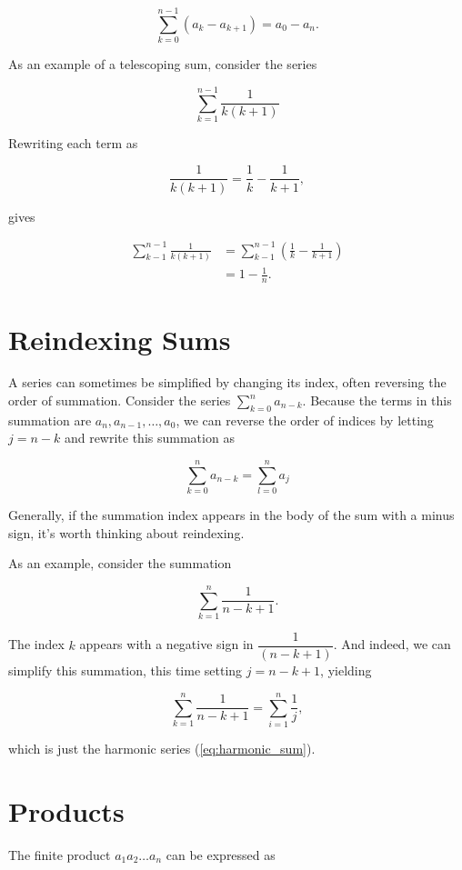 \[
    \sum_{k=0}^{n-1}\left(a_k-a_{k+1}\right)=a_0-a_n .
\]

As an example of a telescoping sum, consider the series

\[
\sum_{k=1}^{n-1} \frac{1}{k(k+1)}
\]

Rewriting each term as

\[
\frac{1}{k(k+1)}=\frac{1}{k}-\frac{1}{k+1},
\]

gives

\begin{align}
\sum_{k-1}^{n-1} \frac{1}{k(k+1)} & =\sum_{k-1}^{n-1}\left(\frac{1}{k}-\frac{1}{k+1}\right) \nonumber \\
& =1-\frac{1}{n} . \label{eq:telescoping-example}
\end{align}

\section*{Reindexing Sums}
A series can sometimes be simplified by changing its index, often reversing the order of summation. Consider the series $\sum_{k=0}^n a_{n-k}$. Because the terms in this summation are $a_n, a_{n-1}, \ldots, a_0$, we can reverse the order of indices by letting $j=n-k$ and rewrite this summation as

$$
\sum_{k=0}^n a_{n-k}=\sum_{l=0}^n a_j
$$


Generally, if the summation index appears in the body of the sum with a minus sign, it's worth thinking about reindexing.

As an example, consider the summation

\begin{equation}
    \sum_{k=1}^n \frac{1}{n-k+1} . \label{eq:reindexing-example}
\end{equation}


The index $k$ appears with a negative sign in $\dfrac{1}{(n-k+1)}$. And indeed, we can simplify this summation, this time setting $j=n-k+1$, yielding

\begin{equation}
    \sum_{k=1}^n \frac{1}{n-k+1}=\sum_{i=1}^n \frac{1}{j}, \label{eq:reindexing-example-solution} 
\end{equation}

which is just the harmonic series (\ref{eq:harmonic_sum}).

\section*{Products}
The finite product $a_1 a_2 \ldots a_n$ can be expressed as

